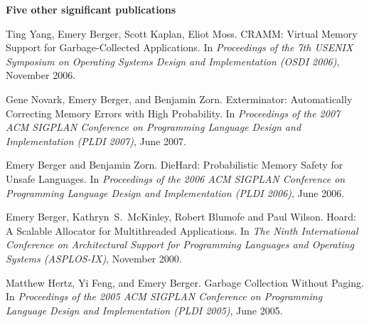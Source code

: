 \documentclass[11pt]{article}
\begin{document}
\begin{description}
\setlength{\labelsep}{0ex}
\setlength{\itemsep}{-0.5ex}

\item {\bf\textsf {Five other significant publications}}

\item Ting Yang, Emery Berger, Scott Kaplan, Eliot Moss. CRAMM: Virtual Memory Support for Garbage-Collected Applications. In {\em Proceedings of the 7th {USENIX} Symposium on Operating Systems Design and Implementation ({OSDI} 2006)}, November 2006.

\item Gene Novark, Emery Berger, and Benjamin Zorn. Exterminator: Automatically Correcting Memory Errors with High Probability. In {\em Proceedings of the 2007 {ACM} {SIGPLAN} Conference on Programming Language Design and Implementation ({PLDI} 2007)}, June 2007.

\item Emery Berger and Benjamin Zorn. DieHard: Probabilistic Memory Safety for Unsafe Languages. In {\em Proceedings of the 2006 {ACM} {SIGPLAN} Conference on Programming Language Design and Implementation ({PLDI} 2006)}, June 2006.

\item Emery Berger, Kathryn~S.~McKinley, Robert Blumofe and Paul Wilson. Hoard: A Scalable Allocator for Multithreaded Applications. In {\em The Ninth International Conference on Architectural Support for Programming Languages and Operating Systems ({ASPLOS}-IX)}, November 2000.

\item Matthew Hertz, Yi Feng, and Emery Berger. Garbage Collection Without Paging. In {\em Proceedings of the 2005 {ACM} {SIGPLAN} Conference on Programming Language Design and Implementation ({PLDI} 2005)}, June 2005.




\end{description}
\end{document}
